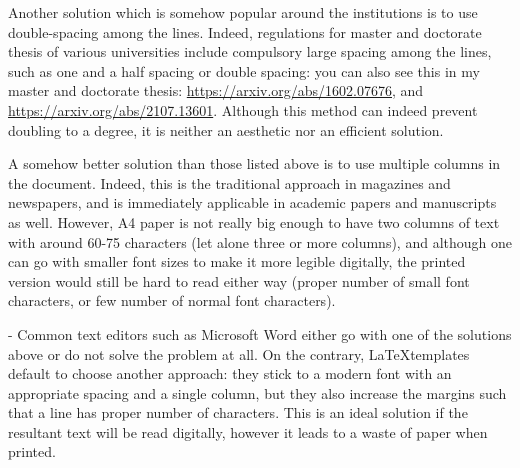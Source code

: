 \begin{fullwidth}
\begin{DoubleSpace}
	Another solution which is somehow popular around the institutions is to use double-spacing among the lines. Indeed, regulations for master and doctorate thesis of various universities include compulsory large spacing among the lines, such as one and a half spacing or double spacing: you can also see this in my master and doctorate thesis: \href{https://arxiv.org/abs/1602.07676}{https://arxiv.org/abs/1602.07676}, and \href{https://arxiv.org/abs/2107.13601}{https://arxiv.org/abs/2107.13601}. Although this method can indeed prevent doubling to a degree, it is neither an aesthetic nor an efficient solution.
\end{DoubleSpace}
\vspace*{-\baselineskip}
	\begin{multicols}{2}
	A somehow better solution than those listed above is to use multiple columns in the document. Indeed, this is the traditional approach in magazines and newspapers, and is immediately applicable in academic papers and manuscripts as well. However, A4 paper is not really big enough to have two columns of text with around 60-75 characters (let alone three or more columns), and although one can go with smaller font sizes to make it more legible digitally, the printed version would still be hard to read either way (proper number of small font characters, or few number of normal font characters).
\end{multicols}
\end{fullwidth} 
\calccentering{\unitlength}
\begin{adjustwidth*}{-\unitlength}{\unitlength}
\qquad Common text editors such as Microsoft Word either go with one of the solutions above or do not solve the problem at all. On the contrary, \LaTeX\;templates default to choose another approach: they stick to a modern font with an appropriate spacing and a single column, but they also increase the margins such that a line has proper number of characters. This is an ideal solution if the resultant text will be read digitally, however it leads to a waste of paper when printed.
\end{adjustwidth*}
\vspace*{\baselineskip}
\sidebar{\vspace*{50\baselineskip}}
